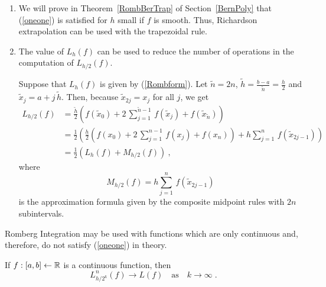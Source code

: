 \begin{rmkList}
\begin{enumerate}
\item We will prove in Theorem~\ref{RombBerTrap} of
Section~\ref{BernPoly} that (\ref{oneone}) is satisfied
for $h$ small if $f$ is smooth.   Thus, Richardson extrapolation can
be used with the trapezoidal rule.
\item The value of $L_h(f)$ can be used to reduce the number of
operations in the computation of $L_{h/2}(f)$.

Suppose that $L_h(f)$ is given by (\ref{Rombform}).  Let
$\tilde{n} = 2n$,
$\displaystyle \tilde{h} = \frac{b-a}{\tilde{n}} = \frac{h}{2}$ and
$\tilde{x}_j = a + j\,\tilde{h}$.  Then, because
$\tilde{x}_{2j} = x_j$ for all $j$, we get
\begin{align*}
L_{h/2}(f) &= \frac{\tilde{h}}{2} \left( f(\tilde{x}_0) +
 2\,\sum_{j=1}^{\tilde{n}-1}\,f(\tilde{x}_j) +
 f(\tilde{x}_{\tilde{n}}) \right) \\
&= \frac{1}{2} \left(\frac{h}{2} \left( f(x_0) +
 2\,\sum_{j=1}^{n-1}\,f(x_j) + f(x_n)\right) +
 h\sum_{j=1}^{n}\,f(\tilde{x}_{2j-1}) \right) \\
&= \frac{1}{2} \left(L_h(f) + M_{h/2}(f) \right) \ ,
\end{align*}
where
\[
M_{h/2}(f) = h\sum_{j=1}^{n}\,f(\tilde{x}_{2j-1})
\]
is the approximation formula given by the composite midpoint rules with
$2n$ subintervals.
\end{enumerate}
\end{rmkList}

Romberg Integration may be used with functions which are only
continuous and, therefore, do not satisfy (\ref{oneone}) in theory.

\begin{theorem}
If $f:[a,b]\leftarrow \mathbb{R}$ is a continuous function, then
\begin{equation}\label{convRich}
L_{h/2^k}^n(f) \rightarrow L(f) \quad \text{as} \quad
k \rightarrow \infty \; .
\end{equation}
\end{theorem}

